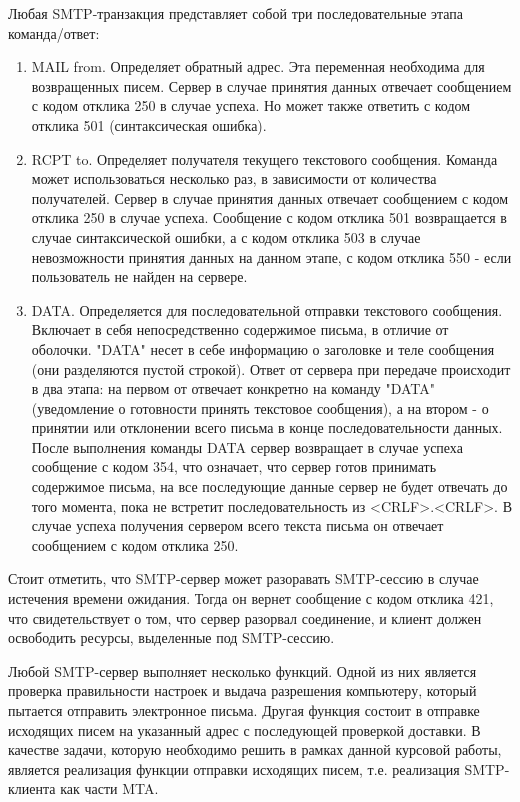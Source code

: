\documentclass[a4paper,12pt]{report}
\begin{document}
	Любая SMTP-транзакция представляет собой три последовательные этапа команда/ответ:
	\begin{enumerate}
		\item MAIL from. Определяет обратный адрес. Эта переменная необходима для возвращенных писем. Сервер в случае принятия данных отвечает сообщением с кодом отклика 250 в случае успеха. Но может также ответить с кодом отклика 501 (синтаксическая ошибка). 
		\item RCPT to. Определяет получателя текущего текстового сообщения. Команда может использоваться несколько раз, в зависимости от количества получателей. Сервер в случае принятия данных отвечает сообщением с кодом отклика 250 в случае успеха. Сообщение с кодом отклика 501 возвращается в случае синтаксической ошибки, а с кодом отклика 503 в случае невозможности принятия данных на данном этапе, с кодом отклика 550 - если пользователь не найден на сервере.
		\item DATA. Определяется для последовательной отправки текстового сообщения. Включает в себя непосредственно содержимое письма, в отличие от оболочки. "DATA" несет в себе информацию о заголовке и теле сообщения (они разделяются пустой строкой). Ответ от сервера при передаче происходит в два этапа: на первом от отвечает конкретно на команду "DATA" (уведомление о готовности принять текстовое сообщения), а на втором - о принятии или отклонении всего письма в конце последовательности данных. После выполнения команды DATA сервер возвращает в случае успеха сообщение с кодом 354, что означает, что сервер готов принимать содержимое письма, на все последующие данные сервер не будет отвечать до того момента, пока не встретит последовательность из <CRLF>.<CRLF>. В случае успеха получения сервером всего текста письма он отвечает сообщением с кодом отклика 250.
	\end{enumerate}

	Стоит отметить, что SMTP-сервер может разоравать SMTP-сессию в случае истечения времени ожидания. Тогда он вернет сообщение с кодом отклика 421, что свидетельствует о том, что сервер разорвал соединение, и клиент должен освободить ресурсы, выделенные под SMTP-сессию.  

	Любой SMTP-сервер выполняет несколько функций. Одной из них является проверка правильности настроек и выдача разрешения компьютеру, который пытается отправить электронное письма. Другая функция состоит в отправке исходящих писем на указанный адрес с последующей проверкой доставки. В качестве задачи, которую необходимо решить в рамках данной курсовой работы, является реализация функции отправки исходящих писем, т.е. реализация SMTP-клиента как части MTA.
\end{document}
